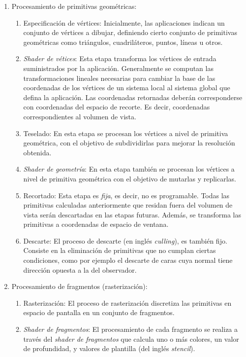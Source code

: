 \begin{enumerate}
	\item Procesamiento de primitivas geométricas:
		\begin{enumerate}
			\item Especificación de vértices: Inicialmente, las aplicaciones indican un conjunto de vértices a dibujar, definiendo cierto conjunto de primitivas geométricas como triángulos, cuadriláteros, puntos, líneas u otros.
			\item \textit{Shader de vétices}: Esta etapa transforma los vértices de entrada suministrados por la aplicación. Generalmente se computan las transformaciones lineales necesarias para cambiar la base de las coordenadas de los vértices de un sistema local al sistema global que defina la aplicación. Las coordenadas retornadas deberán corresponderse con coordenadas del espacio de recorte. Es decir, coordenadas correspondientes al volumen de vista.
			\item Teselado: En esta etapa se procesan los vértices a nivel de primitiva geométrica, con el objetivo de subdividirlas para mejorar la resolución obtenida.
			\item \textit{Shader de geometría}: En esta etapa también se procesan los vértices a nivel de primitiva geométrica con el objetivo de mutarlas y replicarlas.
			\item Recortado: Esta etapa es \textit{fija}, es decir, no es programable. Todas las primitivas calculadas anteriormente que residan fuera del volumen de vista serán descartadas en las etapas futuras. Además, se transforma las primitivas a coordenadas de espacio de ventana.
			\item Descarte: El proceso de descarte (en inglés \textit{culling}), es también fijo. Consiste en la eliminación de primitivas que no cumplan ciertas condiciones, como por ejemplo el descarte de caras cuya normal tiene dirección opuesta a la del observador.
		\end{enumerate}
	\item Procesamiento de fragmentos (rasterización):
		\begin{enumerate}
			\item Rasterización: El proceso de rasterización discretiza las primitivas en espacio de pantalla en un conjunto de fragmentos.
			\item \textit{Shader de fragmentos}: El procesamiento de cada fragmento se realiza a través del \textit{shader de fragmentos} que calcula uno o más colores, un valor de profundidad, y valores de plantilla (del inglés \textit{stencil}).

\end{enumerate}
\end{enumerate}
